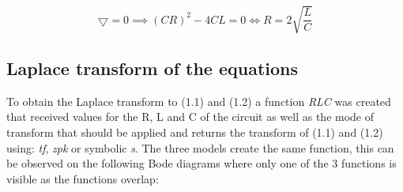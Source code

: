 \documentclass[a4paper,12pt]{article}
\begin{document}
\[
\bigtriangledown = 0 \implies (CR)^2 - 4CL = 0 \iff R = 2\sqrt{\frac{L}{C}}
\]

\vspace{0.5cm}

\subsection{Laplace transform of the equations}

\vspace{0.5cm}

To obtain the Laplace transform to (1.1) and (1.2) a function \textit{RLC} was created that received values for the R, L and C of the circuit as well as the mode of transform that should be applied and returns the transform of (1.1) and (1.2) using: \textit{tf}, \textit{zpk} or symbolic \textit{s}. The three models create the same function, this can be observed on the following Bode diagrams where only one of the 3 functions is visible as the functions overlap:

\vspace{0.5cm}
\end{document}
